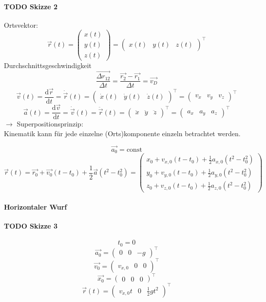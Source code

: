 \documentclass[a4paper]{scrartcl}
\theoremstyle{definition}
\theoremstyle{plain}
\theoremstyle{plain}
\theoremstyle{remark}
\theoremstyle{remark}
\theoremstyle{remark}
\begin{document}
\paragraph{{\bfseries\sffamily TODO} Skizze 2}
\label{sec-2-1-2-1}
Ortsvektor:
\[\vec{r}(t) = \begin{pmatrix} x(t) \\ y(t) \\ z(t) \end{pmatrix} = {\begin{pmatrix} x(t) & y(t) & z(t)\end{pmatrix}}^\intercal\]
Durchschnittsgeschwindigkeit
\[\frac{\vec{\Delta r_{12}}}{\Delta t} = \frac{\vec{r_2} - \vec{r_1}}{\Delta t} = \vec{v_D}\]
\[\vec{v}(t) = \frac{\mathrm{d}\vec{r}}{\mathrm{d}t} = \dot{\vec{r}}(t) = {\begin{pmatrix}\dot{x}(t) & \dot{y}(t) & \dot{z}(t)\end{pmatrix}}^\intercal = {\begin{pmatrix} v_x & v_y & v_z\end{pmatrix}}^\intercal\]
\[\vec{a}(t) = \frac{\mathrm{d}\vec{v}}{\mathrm{d}t} = \dot{\vec{v}}(t) = \ddot{\vec{r}}(t) = {\begin{pmatrix} \ddot{x} & \ddot{y} & \ddot{z}\end{pmatrix}}^\intercal = {\begin{pmatrix} a_x & a_y & a_z \end{pmatrix}}^\intercal\]
$\rightarrow$ Superpositionsprinzip: \\
        Kinematik kann für jede einzelne (Orts)komponente einzeln betrachtet werden.

\[\vec{a_0} = \text{const}\]
\[\vec{r}(t) = \vec{r_0} + \vec{v_0}(t-t_0) + \frac{1}{2}\vec{a}(t^2-t_0^2) = \begin{pmatrix} x_0 + v_{x,0}(t-t_0) + \frac{1}{2} a_{x,0}(t^2-t_0^2) \\ y_0 + v_{y,0}(t-t_0) + \frac{1}{2} a_{y,0}(t^2-t_0^2) \\ z_0 + v_{z,0}(t-t_0) + \frac{1}{2} a_{z,0}(t^2-t_0^2) \end{pmatrix}\]
\paragraph{Horizontaler Wurf}
\label{sec-2-1-2-2}
\paragraph{{\bfseries\sffamily TODO} Skizze 3}
\label{sec-2-1-2-3}
\[t_0 = 0\]
\[\vec{a_0} =  {\begin{pmatrix} 0 & 0 & -g \end{pmatrix}}^\intercal\]
\[\vec{v_0} =  {\begin{pmatrix} v_{x,0} & 0 & 0 \end{pmatrix}}^\intercal\]
\[\vec{x_0} =  {\begin{pmatrix} 0 & 0 & 0 \end{pmatrix}}^\intercal\]
\[\vec{r}(t) =  {\begin{pmatrix} v_{x,0}t & 0 & \frac{1}{2}gt^2 \end{pmatrix}}^\intercal\]
\end{document}
